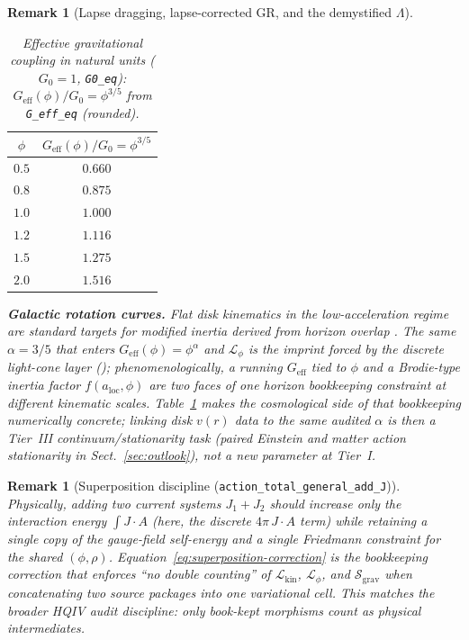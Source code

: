 \documentclass[11pt]{amsart}
\newtheorem{remark}[theorem]{Remark}
\begin{document}
\begin{remark}[\texorpdfstring{Lapse dragging, lapse-corrected GR, and the demystified $\Lambda$}{Lapse dragging, lapse-corrected GR, and demystified Lambda}]
\begin{table}[ht]
\centering
\small
\caption{Effective gravitational coupling in natural units (\(G_0=1\), \texttt{G0\_eq}): \(G_{\mathrm{eff}}(\phi)/G_0=\phi^{3/5}\) from \texttt{G\_eff\_eq} (rounded).}
\label{tab:Geff-numerics}
\begin{tabular}{@{}c@{\quad}c@{}}
\hline
\(\phi\) & \(G_{\mathrm{eff}}(\phi)/G_0=\phi^{3/5}\) \\
\hline
\(0.5\) & \(0.660\) \\
\(0.8\) & \(0.875\) \\
\(1.0\) & \(1.000\) \\
\(1.2\) & \(1.116\) \\
\(1.5\) & \(1.275\) \\
\(2.0\) & \(1.516\) \\
\hline
\end{tabular}
\end{table}

\medskip
\noindent\textbf{Galactic rotation curves.}
Flat disk kinematics in the low-acceleration regime are standard targets for modified inertia derived from horizon overlap \cite{brodie2026}. The \emph{same} \(\alpha=3/5\) that enters \(G_{\mathrm{eff}}(\phi)=\phi^{\alpha}\) and \(\mathcal{L}_\phi\) is the imprint forced by the discrete light-cone layer (); phenomenologically, a running \(G_{\mathrm{eff}}\) tied to \(\phi\) and a Brodie-type inertia factor \(f(a_{\mathrm{loc}},\phi)\) are two faces of one horizon bookkeeping constraint at different kinematic scales. Table~\ref{tab:Geff-numerics} makes the cosmological side of that bookkeeping numerically concrete; linking disk \(v(r)\) data to the same audited \(\alpha\) is then a Tier~III continuum/stationarity task (paired Einstein and matter action stationarity in Sect.~\ref{sec:outlook}), not a new parameter at Tier~I.
\end{remark}

\begin{remark}[Superposition discipline (\texorpdfstring{\texttt{action\_total\_general\_add\_J}}{action_total_general_add_J})]
\label{rem:superposition}
Physically, adding two current systems \(J_1+J_2\) should increase only the interaction energy \(\int J\!\cdot\!A\) (here, the discrete \(4\pi\,J\!\cdot\!A\) term) while retaining a \emph{single} copy of the gauge-field self-energy and a \emph{single} Friedmann constraint for the shared \((\phi,\rho)\). Equation~\eqref{eq:superposition-correction} is the bookkeeping correction that enforces ``no double counting'' of \(\mathcal{L}_{\mathrm{kin}}\), \(\mathcal{L}_\phi\), and \(\mathcal{S}_{\mathrm{grav}}\) when concatenating two source packages into one variational cell. This matches the broader HQIV audit discipline: only book-kept morphisms count as physical intermediates.
\end{remark}
\end{document}

